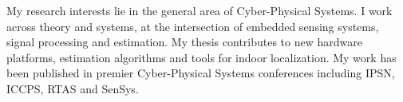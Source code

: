 \documentclass[11mpt]{article}
\begin{document}
My research interests lie in the general area of Cyber-Physical Systems. I work across theory and systems, at the intersection of embedded sensing systems, signal processing and estimation. My thesis contributes to new hardware platforms, estimation algorithms and tools for indoor localization. My work has been published in premier Cyber-Physical Systems conferences including IPSN, ICCPS, RTAS and SenSys. \\

\end{document}
